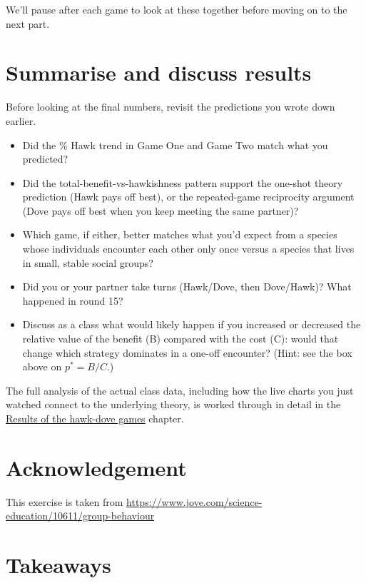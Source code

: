 \documentclass[
  a4paper]{book}
\providecommand{\tightlist}{%
  \setlength{\itemsep}{0pt}\setlength{\parskip}{0pt}}
\begin{document}
We'll pause after each game to look at these together before moving on to the next part.

\section{Summarise and discuss results}\label{summarise-and-discuss-results}

Before looking at the final numbers, revisit the predictions you wrote down earlier.

\begin{itemize}
\tightlist
\item
  Did the \% Hawk trend in Game One and Game Two match what you predicted?
\item
  Did the total-benefit-vs-hawkishness pattern support the one-shot theory prediction (Hawk pays off best), or the repeated-game reciprocity argument (Dove pays off best when you keep meeting the same partner)?
\item
  Which game, if either, better matches what you'd expect from a species whose individuals encounter each other only once versus a species that lives in small, stable social groups?
\item
  Did you or your partner take turns (Hawk/Dove, then Dove/Hawk)? What happened in round 15?
\item
  Discuss as a class what would likely happen if you increased or decreased the relative value of the benefit (B) compared with the cost (C): would that change which strategy dominates in a one-off encounter? (Hint: see the box above on \(p^* = B/C\).)
\end{itemize}

The full analysis of the actual class data, including how the live charts you just watched connect to the underlying theory, is worked through in detail in the \hyperref[results-of-the-hawk-dove-games]{Results of the hawk-dove games} chapter.

\section{Acknowledgement}\label{acknowledgement}

This exercise is taken from \url{https://www.jove.com/science-education/10611/group-behaviour}

\section{Takeaways}\label{takeaways-23}
\end{document}
